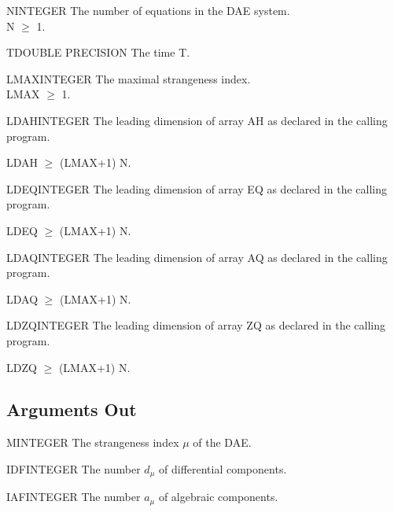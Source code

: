 \begin{entry}{N}{INTEGER}
  The number of equations in the DAE system. \\
  N $\ge$ 1.  
\end{entry}

\begin{entry}{T}{DOUBLE PRECISION}
  The time T.
\end{entry}

\begin{entry}{LMAX}{INTEGER}
  The maximal strangeness index.\\
  LMAX $\ge$ 1.  
\end{entry}

\begin{entry}{LDAH}{INTEGER}
  The leading dimension of array AH as declared in the calling
  program.

  LDAH $\ge$ (LMAX+1) N.
\end{entry}

\begin{entry}{LDEQ}{INTEGER}
  The leading dimension of array EQ as declared in the calling
  program.

  LDEQ $\ge$ (LMAX+1) N.
\end{entry}

\begin{entry}{LDAQ}{INTEGER}
  The leading dimension of array AQ as declared in the calling
  program.

  LDAQ $\ge$ (LMAX+1) N.
\end{entry}

\begin{entry}{LDZQ}{INTEGER}
  The leading dimension of array ZQ as declared in the calling
  program.

  LDZQ $\ge$ (LMAX+1) N.
\end{entry}

\subsection{Arguments Out}

\begin{entry}{M}{INTEGER}
  The strangeness index $\mu$ of the DAE.
\end{entry}

\begin{entry}{IDF}{INTEGER}
  The number $d_{\mu}$ of differential components. 
\end{entry}

\begin{entry}{IAF}{INTEGER}
  The number $a_{\mu}$ of algebraic components. 
\end{entry}

